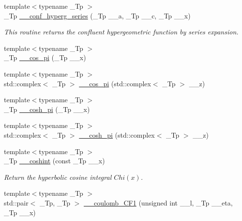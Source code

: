 \begin{DoxyCompactItemize}
{\footnotesize template$<$typename \+\_\+\+Tp $>$ }\\\+\_\+\+Tp \hyperlink{namespacestd_1_1____detail_a5f701a63e17238132405dd209660fc1d}{\+\_\+\+\_\+conf\+\_\+hyperg\+\_\+series} (\+\_\+\+Tp \+\_\+\+\_\+a, \+\_\+\+Tp \+\_\+\+\_\+c, \+\_\+\+Tp \+\_\+\+\_\+x)
\begin{DoxyCompactList}\small\item\em This routine returns the confluent hypergeometric function by series expansion. \end{DoxyCompactList}\item 
{\footnotesize template$<$typename \+\_\+\+Tp $>$ }\\\+\_\+\+Tp \hyperlink{namespacestd_1_1____detail_abfdaa500e1321747a0ad391ca3416a0b}{\+\_\+\+\_\+cos\+\_\+pi} (\+\_\+\+Tp \+\_\+\+\_\+x)
\item 
{\footnotesize template$<$typename \+\_\+\+Tp $>$ }\\std\+::complex$<$ \+\_\+\+Tp $>$ \hyperlink{namespacestd_1_1____detail_a0332c7fb29ed7be543103adc8d04d39d}{\+\_\+\+\_\+cos\+\_\+pi} (std\+::complex$<$ \+\_\+\+Tp $>$ \+\_\+\+\_\+z)
\item 
{\footnotesize template$<$typename \+\_\+\+Tp $>$ }\\\+\_\+\+Tp \hyperlink{namespacestd_1_1____detail_ae6e440447e88191b3cd19daaf7fda96e}{\+\_\+\+\_\+cosh\+\_\+pi} (\+\_\+\+Tp \+\_\+\+\_\+x)
\item 
{\footnotesize template$<$typename \+\_\+\+Tp $>$ }\\std\+::complex$<$ \+\_\+\+Tp $>$ \hyperlink{namespacestd_1_1____detail_a257e13bd4fa9711a87ea68a783ee40d9}{\+\_\+\+\_\+cosh\+\_\+pi} (std\+::complex$<$ \+\_\+\+Tp $>$ \+\_\+\+\_\+z)
\item 
{\footnotesize template$<$typename \+\_\+\+Tp $>$ }\\\+\_\+\+Tp \hyperlink{namespacestd_1_1____detail_ad48a89a591f7b58a047f072e6e383663}{\+\_\+\+\_\+coshint} (const \+\_\+\+Tp \+\_\+\+\_\+x)
\begin{DoxyCompactList}\small\item\em Return the hyperbolic cosine integral $ Chi(x) $. \end{DoxyCompactList}\item 
{\footnotesize template$<$typename \+\_\+\+Tp $>$ }\\std\+::pair$<$ \+\_\+\+Tp, \+\_\+\+Tp $>$ \hyperlink{namespacestd_1_1____detail_a0737f268d024ed5d66d3e926239a5c49}{\+\_\+\+\_\+coulomb\+\_\+\+C\+F1} (unsigned int \+\_\+\+\_\+l, \+\_\+\+Tp \+\_\+\+\_\+eta, \+\_\+\+Tp \+\_\+\+\_\+x)

\end{DoxyCompactItemize}

